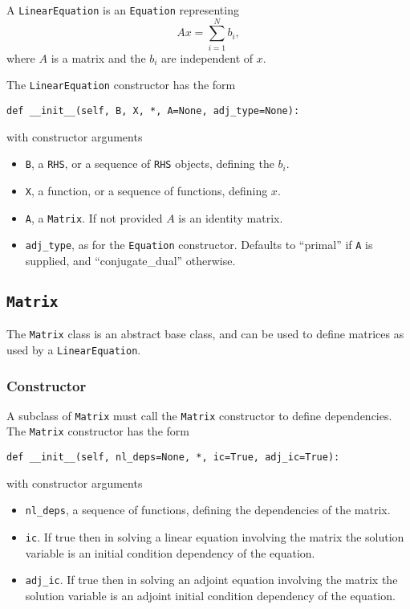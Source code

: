\documentclass[11pt]{article}
\begin{document}
A \texttt{LinearEquation} is an \texttt{Equation} representing
\begin{equation*}
  A x = \sum_{i = 1}^N b_i,
\end{equation*}
where $A$ is a matrix and the $b_i$ are independent of $x$.

The \texttt{LinearEquation} constructor has the form
\begin{lstlisting}
def __init__(self, B, X, *, A=None, adj_type=None):
\end{lstlisting}
with constructor arguments
\begin{itemize}
  \item \texttt{B}, a \texttt{RHS}, or a sequence of \texttt{RHS} objects,
    defining the $b_i$.
  \item \texttt{X}, a function, or a sequence of functions, defining $x$.
  \item \texttt{A}, a \texttt{Matrix}. If not provided $A$ is an identity
    matrix.
  \item \texttt{adj\_type}, as for the \texttt{Equation} constructor. Defaults
    to ``primal'' if \texttt{A} is supplied, and ``conjugate\_dual'' otherwise.
\end{itemize}

\subsection{\texttt{Matrix}}

The \texttt{Matrix} class is an abstract base class, and can be used to define
matrices as used by a \texttt{LinearEquation}.

\subsubsection{Constructor}

A subclass of \texttt{Matrix} must call the \texttt{Matrix} constructor to
define dependencies. The \texttt{Matrix} constructor has the form
\begin{lstlisting}
def __init__(self, nl_deps=None, *, ic=True, adj_ic=True):
\end{lstlisting}
with constructor arguments
\begin{itemize}
  \item \texttt{nl\_deps}, a sequence of functions, defining the dependencies
    of the matrix.
  \item \texttt{ic}. If true then in solving a linear equation involving the
    matrix the solution variable is an initial condition dependency of the
    equation.
  \item \texttt{adj\_ic}. If true then in solving an adjoint equation
    involving the matrix the solution variable is an adjoint initial
    condition dependency of the equation.
\end{itemize}
\end{document}
